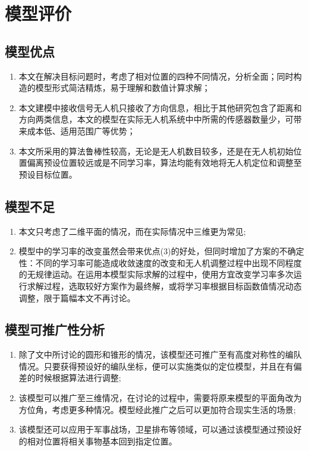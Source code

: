 \documentclass[withoutpreface,bwprint]{cumcmthesis} %
\begin{document}
\section{模型评价}

\subsection{模型优点}

\begin{enumerate}[{1)}]
    \item 本文在解决目标问题时，考虑了相对位置的四种不同情况，分析全面；同时构造的模型形式简洁精炼，易于理解和数值计算求解；
    \item 本文建模中接收信号无人机只接收了方向信息，相比于其他研究包含了距离和方向两类信息，本文的模型在实际无人机系统中中所需的传感器数量少，可带来成本低、适用范围广等优势；
    \item 本文所采用的算法鲁棒性较高，无论是无人机数目较多，还是在无人机初始位置偏离预设位置较远或是不同学习率，算法均能有效地将无人机定位和调整至预设目标位置。
\end{enumerate}

\subsection{模型不足}

\begin{enumerate}[{1)}]
    \item 本文只考虑了二维平面的情况，而在实际情况中三维更为常见;
    \item 模型中的学习率的改变虽然会带来优点(3)的好处，但同时增加了方案的不确定性：不同的学习率可能造成收敛速度的改变和无人机调整过程中出现不同程度的无规律运动。在运用本模型实际求解的过程中，使用方宜改变学习率多次运行求解过程，选取较好方案作为最终解，或将学习率根据目标函数值情况动态调整，限于篇幅本文不再讨论。


\end{enumerate}

\subsection{模型可推广性分析}

\begin{enumerate}[{1)}]
    \item 除了文中所讨论的圆形和锥形的情况，该模型还可推广至有高度对称性的编队情况。只要获得预设好的编队坐标，便可以实施类似的定位模型，并且在有偏差的时候根据算法进行调整;
    \item 该模型可以推广至三维情况，在讨论的过程中，需要将原来模型的平面角改为方位角，考虑更多种情况。模型经此推广之后可以更加符合现实生活的场景;
    \item 该模型还可以应用于军事战场，卫星排布等领域，可以通过该模型通过预设好的相对位置将相关事物基本回到指定位置。
\end{enumerate}
\end{document}
